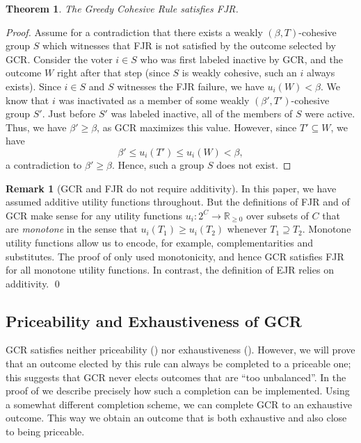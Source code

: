 \documentclass[10pt]{scrartcl}
\renewcommand*{\leq}{\leqslant}
\renewcommand*{\ge}{\geqslant}
\renewcommand*{\geq}{\geqslant}
\theoremstyle{definition}
\newtheorem{remark}{Remark}
\theoremstyle{plain}
\newtheorem{theorem}{Theorem}
\begin{document}
\begin{theorem}
	\label{thm:gcr-fjr}
	The Greedy Cohesive Rule satisfies FJR.
\end{theorem}
\begin{proof}
	Assume for a contradiction that there exists a weakly $(\beta, T)$-cohesive group $S$ which witnesses that FJR is not satisfied by the outcome selected by GCR. Consider the voter $i \in S$ who was first labeled inactive by GCR, and the outcome $W$ right after that step (since $S$ is weakly cohesive, such an $i$ always exists). Since $i \in S$ and $S$ witnesses the FJR failure, we have $u_i(W) < \beta$. We know that $i$ was inactivated as a member of some weakly $(\beta', T')$-cohesive group $S'$. Just before $S'$ was labeled inactive, all of the members of $S$ were active. Thus, we have $\beta' \geq \beta$, as GCR maximizes this value. However, since $T' \subseteq W$, we have 
	\[ \beta' \leq u_i(T') \leq u_i(W) < \beta, \] 
	a contradiction to $\beta' \geq \beta$. Hence, such a group $S$ does not exist.
\end{proof}

\begin{remark}[GCR and FJR do not require additivity]
	In this paper, we have assumed additive utility functions throughout. But the definitions of FJR and of GCR make sense for any utility functions $u_i : 2^C \to \mathbb{R}_{\ge 0}$ over subsets of $C$ that are \emph{monotone} in the sense that $u_i(T_1) \ge u_i(T_2)$ whenever $T_1 \supseteq T_2$. Monotone utility functions allow us to encode, for example, complementarities and substitutes. The proof of  only used monotonicity, and hence GCR satisfies FJR for all monotone utility functions. In contrast, the definition of EJR relies on additivity.
	\qed
\end{remark}

\subsection{Priceability and Exhaustiveness of GCR}
\label{sec:gcr-extendable}
GCR satisfies neither priceability () nor exhaustiveness (). However, we will prove that an outcome elected by this rule can always be completed to a priceable one; this suggests that GCR never elects outcomes that are ``too unbalanced''. In the proof of  we describe precisely how such a completion can be implemented. Using a somewhat different completion scheme, we can complete GCR to an exhaustive outcome. This way we obtain an outcome that is both exhaustive and also close to being priceable.
\end{document}
